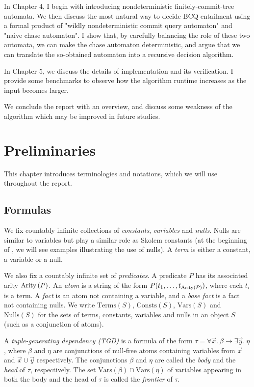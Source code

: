 \documentclass[12pt]{report}
\theoremstyle{plain}
\theoremstyle{definition}
\def\Vars{{\mathrm{Vars}}}
\def\Consts{{\mathrm{Consts}}}
\def\Terms{{\mathrm{Terms}}}
\def\Nulls{{\mathrm{Nulls}}}
\newcommand{\Arity}[1]{\ensuremath{\normalfont{\operatorname{Arity}} \left( #1 \right)}}
\begin{document}
In Chapter 4, I begin with introducing nondeterministic finitely-commit-tree automata. We then discuss the most natural way to decide BCQ entailment using a formal product of "wildly nondeterministic commit query automaton" and "naive chase automaton". I show that, by carefully balancing the role of these two automata, we can make the chase automaton deterministic, and argue that we can translate the so-obtained automaton into a recursive decision algorithm.

In Chapter 5, we discuss the details of implementation and its verification. I provide some benchmarks to observe how the algorithm runtime increases as the input becomes larger.

We conclude the report with an overview, and discuss some weakness of the algorithm which may be improved in future studies.

\newpage
\chapter{Preliminaries}

This chapter introduces terminologies and notations, which we will use throughout the report.

\section{Formulas}

We fix countably infinite collections of \emph{constants}, \emph{variables} and \emph{nulls}. Nulls are similar to variables but play a similar role as Skolem constants (at the beginning of , we will see examples illustrating the use of nulls). A \emph{term} is either a constant, a variable or a null.

We also fix a countably infinite set of \emph{predicates}. A predicate $P$ has its associated arity $\Arity{P}$. An \emph{atom} is a string of the form $P(t_1, \ldots, t_{\Arity{P}})$, where each $t_i$ is a term. A \emph{fact} is an atom not containing a variable, and a \emph{base fact} is a fact not containing nulls. We write $\Terms(S)$, $\Consts(S)$, $\Vars(S)$ and $\Nulls(S)$ for the sets of terms, constants, variables and nulls in an object $S$ (such as a conjunction of atoms).

A \emph{tuple-generating dependency (TGD)} is a formula of the form $\tau = \forall \vec{x}.\ \beta \rightarrow \exists \vec{y}.\ \eta$, where $\beta$ and $\eta$ are conjunctions of null-free atoms containing variables from $\vec{x}$ and $\vec{x} \cup \vec{y}$ respectively. The conjunctions $\beta$ and $\eta$ are called the \emph{body} and the \emph{head} of $\tau$, respectively. The set $\Vars(\beta) \cap \Vars(\eta)$ of variables appearing in both the body and the head of $\tau$ is called the \emph{frontier} of $\tau$.
\end{document}
